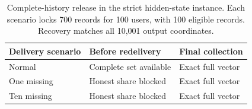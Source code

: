 \begin{table}[t]
\centering
\caption{Complete-history release in the strict hidden-state instance. Each scenario locks 700 records for 100 users, with 100 eligible records. Recovery matches all 10,001 output coordinates.}
\label{tab:complete-history-functional}
\footnotesize
\begin{tabularx}{\columnwidth}{@{}lYY@{}}
\toprule
Delivery scenario & Before redelivery & Final collection \\
\midrule
Normal & Complete set available & Exact full vector \\
One missing & Honest share blocked & Exact full vector \\
Ten missing & Honest share blocked & Exact full vector \\
\bottomrule
\end{tabularx}
\end{table}
